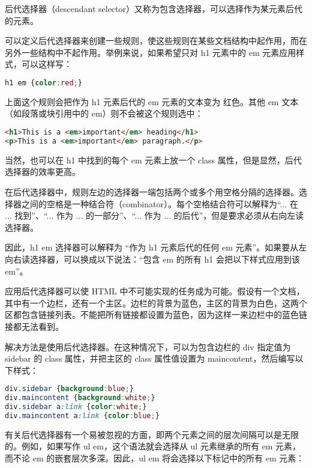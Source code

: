 后代选择器（descendant selector）又称为包含选择器，可以选择作为某元素后代的元素。

可以定义后代选择器来创建一些规则，使这些规则在某些文档结构中起作用，而在另外一些结构中不起作用。举例来说，如果希望只对 h1 元素中的 em 元素应用样式，可以这样写：



\begin{lstlisting}[language=CSS]
h1 em {color:red;}
\end{lstlisting}

上面这个规则会把作为 h1 元素后代的 em 元素的文本变为 红色。其他 em 文本（如段落或块引用中的 em）则不会被这个规则选中：


\begin{lstlisting}[language=HTML]
<h1>This is a <em>important</em> heading</h1>
<p>This is a <em>important</em> paragraph.</p>
\end{lstlisting}

当然，也可以在 h1 中找到的每个 em 元素上放一个 class 属性，但是显然，后代选择器的效率更高。


在后代选择器中，规则左边的选择器一端包括两个或多个用空格分隔的选择器。选择器之间的空格是一种结合符（combinator）。每个空格结合符可以解释为“... 在 ... 找到”、“... 作为 ... 的一部分”、“... 作为 ... 的后代”，但是要求必须从右向左读选择器。

因此，h1 em 选择器可以解释为 “作为 h1 元素后代的任何 em 元素”。如果要从左向右读选择器，可以换成以下说法：“包含 em 的所有 h1 会把以下样式应用到该 em”。

应用后代选择器可以使 HTML 中不可能实现的任务成为可能。假设有一个文档，其中有一个边栏，还有一个主区。边栏的背景为蓝色，主区的背景为白色，这两个区都包含链接列表。不能把所有链接都设置为蓝色，因为这样一来边栏中的蓝色链接都无法看到。


解决方法是使用后代选择器。在这种情况下，可以为包含边栏的 div 指定值为 sidebar 的 class 属性，并把主区的 class 属性值设置为 maincontent，然后编写以下样式：

\begin{lstlisting}[language=CSS]
div.sidebar {background:blue;}
div.maincontent {background:white;}
div.sidebar a:link {color:white;}
div.maincontent a:link {color:blue;}
\end{lstlisting}

有关后代选择器有一个易被忽视的方面，即两个元素之间的层次间隔可以是无限的。例如，如果写作 ul em，这个语法就会选择从 ul 元素继承的所有 em 元素，而不论 em 的嵌套层次多深。因此，ul em 将会选择以下标记中的所有 em 元素：






